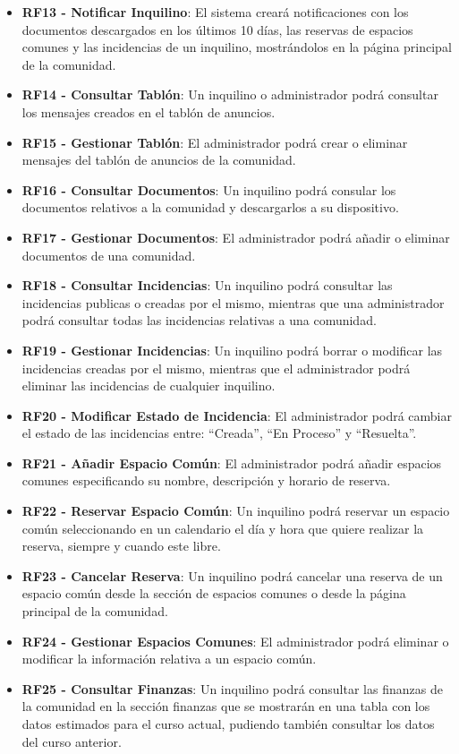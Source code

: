 \begin{itemize}
	\item \textbf{RF13 - Notificar Inquilino}: El sistema creará notificaciones con los documentos descargados en los últimos 10 días, las reservas de espacios comunes y las incidencias de un inquilino, mostrándolos en la página principal de la comunidad.
	\item \textbf{RF14 - Consultar Tablón}: Un inquilino o administrador podrá consultar los mensajes creados en el tablón de anuncios.
	\item \textbf{RF15 - Gestionar Tablón}: El administrador podrá crear o eliminar mensajes del tablón de anuncios de la comunidad.
	\item \textbf{RF16 - Consultar Documentos}: Un inquilino podrá consular los documentos relativos a la comunidad y descargarlos a su dispositivo.
	\item \textbf{RF17 - Gestionar Documentos}: El administrador podrá añadir o eliminar documentos de una comunidad.
	\item \textbf{RF18 - Consultar Incidencias}: Un inquilino podrá consultar las incidencias publicas o creadas por el mismo, mientras que una administrador podrá consultar todas las incidencias relativas a una comunidad.
	\item \textbf{RF19 - Gestionar Incidencias}: Un inquilino podrá borrar o modificar las incidencias creadas por el mismo, mientras que el administrador podrá eliminar las incidencias de cualquier inquilino.
	\item \textbf{RF20 - Modificar Estado de Incidencia}: El administrador podrá cambiar el estado de las incidencias entre: ``Creada'', ``En Proceso'' y ``Resuelta''.
	\item \textbf{RF21 - Añadir Espacio Común}: El administrador podrá añadir espacios comunes especificando su nombre, descripción y horario de reserva.
	\item \textbf{RF22 - Reservar Espacio Común}: Un inquilino podrá reservar un espacio común seleccionando en un calendario el día y hora que quiere realizar la reserva, siempre y cuando este libre.
	\item \textbf{RF23 - Cancelar Reserva}: Un inquilino podrá cancelar una reserva de un espacio común desde la sección de espacios comunes o desde la página principal de la comunidad.
	\item \textbf{RF24 - Gestionar Espacios Comunes}: El administrador podrá eliminar o modificar la información relativa a un espacio común.
	\item \textbf{RF25 - Consultar Finanzas}: Un inquilino podrá consultar las finanzas de la comunidad en la sección finanzas que se mostrarán en una tabla con los datos estimados para el curso actual, pudiendo también consultar los datos del curso anterior.

\end{itemize}
